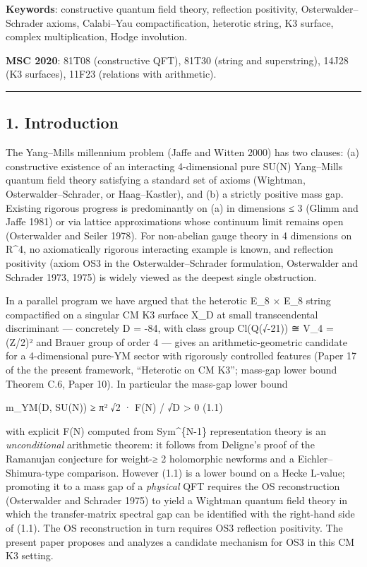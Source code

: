 \documentclass[
 11pt,
 a4paper,
]{article}
\begin{document}
\textbf{Keywords}: constructive quantum field theory, reflection positivity, Osterwalder--Schrader axioms, Calabi--Yau compactification, heterotic string, K3 surface, complex multiplication, Hodge involution.

\textbf{MSC 2020}: 81T08 (constructive QFT), 81T30 (string and superstring), 14J28 (K3 surfaces), 11F23 (relations with arithmetic).

\begin{center}\rule{0.5\linewidth}{0.5pt}\end{center}

\hypertarget{introduction}{%
\subsection{1. Introduction}\label{introduction}}

The Yang--Mills millennium problem (Jaffe and Witten 2000) has two clauses: (a) constructive existence of an interacting 4-dimensional pure SU(N) Yang--Mills quantum field theory satisfying a standard set of axioms (Wightman, Osterwalder--Schrader, or Haag--Kastler), and (b) a strictly positive mass gap. Existing rigorous progress is predominantly on (a) in dimensions ≤ 3 (Glimm and Jaffe 1981) or via lattice approximations whose continuum limit remains open (Osterwalder and Seiler 1978). For non-abelian gauge theory in 4 dimensions on R\^{}4, no axiomatically rigorous interacting example is known, and reflection positivity (axiom OS3 in the Osterwalder--Schrader formulation, Osterwalder and Schrader 1973, 1975) is widely viewed as the deepest single obstruction.

In a parallel program we have argued that the heterotic E\_8 × E\_8 string compactified on a singular CM K3 surface X\_D at small transcendental discriminant --- concretely D = -84, with class group Cl(Q(√-21)) ≅ V\_4 = (Z/2)² and Brauer group of order 4 --- gives an arithmetic-geometric candidate for a 4-dimensional pure-YM sector with rigorously controlled features (Paper 17 of the the present framework, ``Heterotic on CM K3''; mass-gap lower bound Theorem C.6, Paper 10). In particular the mass-gap lower bound

m\_YM(D, SU(N)) ≥ π² √2 · F(N) / √\textbar D\textbar{} \textgreater{} 0 (1.1)

with explicit F(N) computed from Sym\^{}\{N-1\} representation theory is an \emph{unconditional} arithmetic theorem: it follows from Deligne's proof of the Ramanujan conjecture for weight-≥ 2 holomorphic newforms and a Eichler--Shimura-type comparison. However (1.1) is a lower bound on a Hecke L-value; promoting it to a mass gap of a \emph{physical} QFT requires the OS reconstruction (Osterwalder and Schrader 1975) to yield a Wightman quantum field theory in which the transfer-matrix spectral gap can be identified with the right-hand side of (1.1). The OS reconstruction in turn requires OS3 reflection positivity. The present paper proposes and analyzes a candidate mechanism for OS3 in this CM K3 setting.
\end{document}
